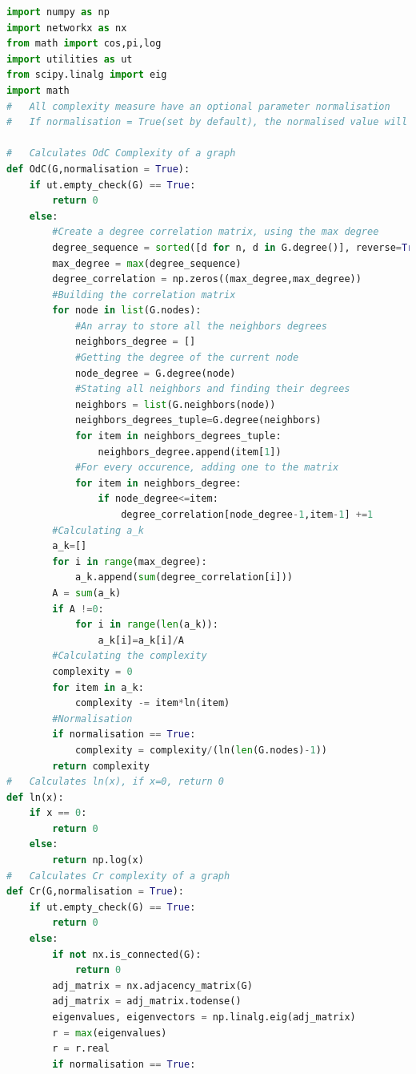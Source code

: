 \documentclass[12pt]{article}
\begin{document}
\begin{lstlisting}[language=Python,breaklines=true]
import numpy as np
import networkx as nx
from math import cos,pi,log
import utilities as ut
from scipy.linalg import eig
import math
#   All complexity measure have an optional parameter normalisation
#   If normalisation = True(set by default), the normalised value will be returned. Otherwise, the unnormalized form will be returned

#   Calculates OdC Complexity of a graph
def OdC(G,normalisation = True):
    if ut.empty_check(G) == True:
        return 0
    else:
        #Create a degree correlation matrix, using the max degree 
        degree_sequence = sorted([d for n, d in G.degree()], reverse=True)
        max_degree = max(degree_sequence)
        degree_correlation = np.zeros((max_degree,max_degree))
        #Building the correlation matrix
        for node in list(G.nodes):
            #An array to store all the neighbors degrees
            neighbors_degree = []
            #Getting the degree of the current node
            node_degree = G.degree(node)
            #Stating all neighbors and finding their degrees
            neighbors = list(G.neighbors(node))
            neighbors_degrees_tuple=G.degree(neighbors)
            for item in neighbors_degrees_tuple:
                neighbors_degree.append(item[1])
            #For every occurence, adding one to the matrix
            for item in neighbors_degree:
                if node_degree<=item:
                    degree_correlation[node_degree-1,item-1] +=1
        #Calculating a_k
        a_k=[]
        for i in range(max_degree):
            a_k.append(sum(degree_correlation[i]))
        A = sum(a_k)
        if A !=0:
            for i in range(len(a_k)):
                a_k[i]=a_k[i]/A
        #Calculating the complexity
        complexity = 0
        for item in a_k:
            complexity -= item*ln(item)
        #Normalisation
        if normalisation == True:
            complexity = complexity/(ln(len(G.nodes)-1))
        return complexity
#   Calculates ln(x), if x=0, return 0
def ln(x):
    if x == 0:
        return 0
    else:
        return np.log(x)
#   Calculates Cr complexity of a graph
def Cr(G,normalisation = True):
    if ut.empty_check(G) == True:
        return 0
    else:
        if not nx.is_connected(G):
            return 0
        adj_matrix = nx.adjacency_matrix(G)
        adj_matrix = adj_matrix.todense()
        eigenvalues, eigenvectors = np.linalg.eig(adj_matrix)
        r = max(eigenvalues)
        r = r.real
        if normalisation == True:

\end{lstlisting}
\end{document}
